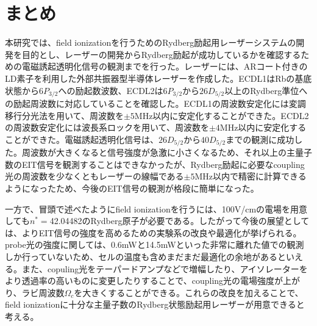 \documentclass[dvipdfmx]{jsreport}
\begin{document}
\chapter{まとめ}
本研究では、field ionizationを行うためのRydberg励起用レーザーシステムの開発を目的とし、レーザーの開発からRydberg励起が成功しているかを確認するための電磁誘起透明化信号の観測までを行った。レーザーには、ARコート付きのLD素子を利用した外部共振器型半導体レーザーを作成した。ECDL1はRbの基底状態から$6P_{3/2}$への励起数波数、ECDL2は$6P_{3/2}$から$26D_{5/2}$以上のRydberg準位への励起周波数に対応していることを確認した。ECDL1の周波数安定化には変調移行分光法を用いて、周波数を$\pm5$MHz以内に安定化することができた。ECDL2の周波数安定化には波長系ロックを用いて、周波数を$\pm4$MHz以内に安定化することができた。電磁誘起透明化信号は、$26D_{5/2}$から$40D_{5/2}$までの観測に成功した。周波数が大きくなると信号強度が急激に小さくなるため、それ以上の主量子数のEIT信号を観測することはできなかったが、Rydberg励起に必要なcoupling光の周波数を少なくともレーザーの線幅である$\pm5$MHz以内で精密に計算できるようになったため、今後のEIT信号の観測が格段に簡単になった。

一方で、冒頭で述べたようにfield ionizationを行うには、100V/cmの電場を用意しても$n^*=$42.04482のRydberg原子が必要である。したがって今後の展望としては、よりEIT信号の強度を高めるための実験系の改良や最適化が挙げられる。probe光の強度に関しては、0.6mWと14.5mWといった非常に離れた値での観測しか行っていないため、セルの温度も含めまだまだ最適化の余地があるといえる。また、copuling光をテーパードアンプなどで増幅したり、アイソレーターをより透過率の高いものに変更したりすることで、coupling光の電場強度が上がり、ラビ周波数$\Omega_c$を大きくすることができる。これらの改良を加えることで、field ionizationに十分な主量子数のRydberg状態励起用レーザーが用意できると考える。






\end{document}
